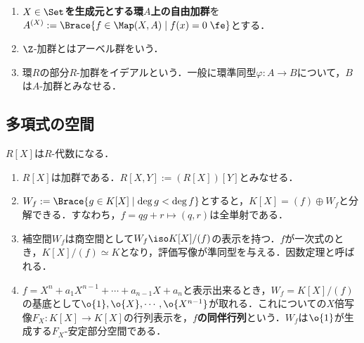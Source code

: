 \documentclass[uplatex, dvipdfmx]{jsreport}
\begin{document}
\begin{example}[加群の例]\mbox{}
    \begin{enumerate}
        \item \textbf{$X\in\Set$を生成元とする環$A$上の自由加群}を$A^{(X)}:=\Brace{f\in\Map(X,A)\mid f(x)=0\;\fe}$とする．
        \item $\Z$-加群とはアーベル群をいう．
        \item 環$R$の部分$R$-加群をイデアルという．一般に環準同型$\varphi:A\to B$について，$B$は$A$-加群とみなせる．
    \end{enumerate}
\end{example}

\subsection{多項式の空間}



\begin{example}[多項式の空間]
    $R[X]$は$R$-代数になる．
    \begin{enumerate}
        \item $R[X]$は加群である．$R[X,Y]:=(R[X])[Y]$とみなせる．
        \item $W_f:=\Brace{g\in K[X]\mid\deg g< \deg f}$とすると，$K[X]=(f)\oplus W_f$と分解できる．すなわち，$f=qg+r\mapsto(q,r)$は全単射である．
        \item 補空間$W_f$は商空間として$W_f\iso K[X]/(f)$の表示を持つ．$f$が一次式のとき，$K[X]/(f)\simeq K$となり，評価写像が準同型を与える．因数定理と呼ばれる．
        \item $f=X^n+a_1X^{n-1}+\cdots+a_{n-1}X+a_n$と表示出来るとき，$W_f=K[X]/(f)$の基底として$\o{1},\o{X},\cdots,\o{X^{n-1}}$が取れる．これについての$X$倍写像$F_X:K[X]\to K[X]$の行列表示を，\textbf{$f$の同伴行列}という．$W_f$は$\o{1}$が生成する$F_X$-安定部分空間である．
    \end{enumerate}
\end{example}
\end{document}

